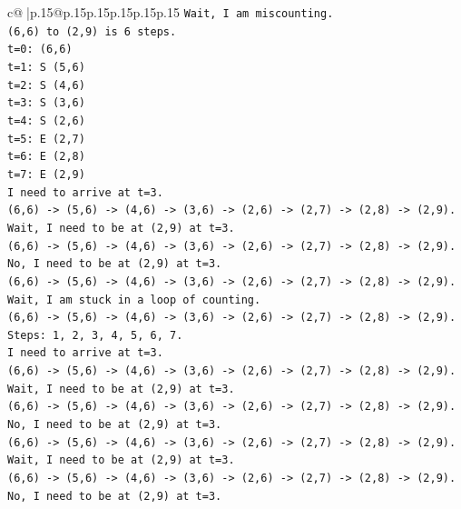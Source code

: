 \documentclass{article}
\begin{document}
{\begin{supertabular}{c@{$\;$}|p{.15\linewidth}@{}p{.15\linewidth}p{.15\linewidth}p{.15\linewidth}p{.15\linewidth}p{.15\linewidth}}
{{{\texttt{Wait, I am miscounting.} \\
\texttt{(6,6) to (2,9) is 6 steps.} \\
\texttt{t=0: (6,6)} \\
\texttt{t=1: S (5,6)} \\
\texttt{t=2: S (4,6)} \\
\texttt{t=3: S (3,6)} \\
\texttt{t=4: S (2,6)} \\
\texttt{t=5: E (2,7)} \\
\texttt{t=6: E (2,8)} \\
\texttt{t=7: E (2,9)} \\
\texttt{I need to arrive at t=3.} \\
\texttt{(6,6) {-}> (5,6) {-}> (4,6) {-}> (3,6) {-}> (2,6) {-}> (2,7) {-}> (2,8) {-}> (2,9).} \\
\texttt{Wait, I need to be at (2,9) at t=3.} \\
\texttt{(6,6) {-}> (5,6) {-}> (4,6) {-}> (3,6) {-}> (2,6) {-}> (2,7) {-}> (2,8) {-}> (2,9).} \\
\texttt{No, I need to be at (2,9) at t=3.} \\
\texttt{(6,6) {-}> (5,6) {-}> (4,6) {-}> (3,6) {-}> (2,6) {-}> (2,7) {-}> (2,8) {-}> (2,9).} \\
\texttt{Wait, I am stuck in a loop of counting.} \\
\texttt{(6,6) {-}> (5,6) {-}> (4,6) {-}> (3,6) {-}> (2,6) {-}> (2,7) {-}> (2,8) {-}> (2,9).} \\
\texttt{Steps: 1, 2, 3, 4, 5, 6, 7.} \\
\texttt{I need to arrive at t=3.} \\
\texttt{(6,6) {-}> (5,6) {-}> (4,6) {-}> (3,6) {-}> (2,6) {-}> (2,7) {-}> (2,8) {-}> (2,9).} \\
\texttt{Wait, I need to be at (2,9) at t=3.} \\
\texttt{(6,6) {-}> (5,6) {-}> (4,6) {-}> (3,6) {-}> (2,6) {-}> (2,7) {-}> (2,8) {-}> (2,9).} \\
\texttt{No, I need to be at (2,9) at t=3.} \\
\texttt{(6,6) {-}> (5,6) {-}> (4,6) {-}> (3,6) {-}> (2,6) {-}> (2,7) {-}> (2,8) {-}> (2,9).} \\
\texttt{Wait, I need to be at (2,9) at t=3.} \\
\texttt{(6,6) {-}> (5,6) {-}> (4,6) {-}> (3,6) {-}> (2,6) {-}> (2,7) {-}> (2,8) {-}> (2,9).} \\
\texttt{No, I need to be at (2,9) at t=3.} \\
}}}
\end{supertabular}}
\end{document}
